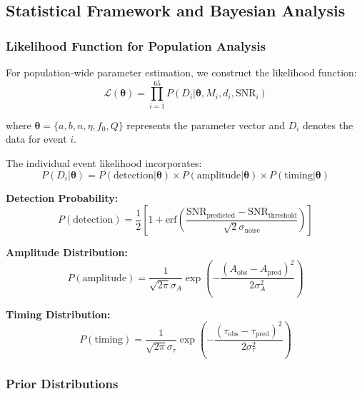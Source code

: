 \documentclass[reprint,amsmath,amssymb,aps,prd]{revtex4-2}
\begin{document}
\subsection{Statistical Framework and Bayesian Analysis}

\subsubsection{Likelihood Function for Population Analysis}

For population-wide parameter estimation, we construct the likelihood function:
\begin{equation}
\mathcal{L}(\boldsymbol{\theta}) = \prod_{i=1}^{65} P(D_i | \boldsymbol{\theta}, M_i, d_i, \text{SNR}_i)
\label{eq:population_likelihood}
\end{equation}

where $\boldsymbol{\theta} = \{a, b, n, \eta, f_0, Q\}$ represents the parameter vector and $D_i$ denotes the data for event $i$.

The individual event likelihood incorporates:
\begin{equation}
P(D_i | \boldsymbol{\theta}) = P(\text{detection} | \boldsymbol{\theta}) \times P(\text{amplitude} | \boldsymbol{\theta}) \times P(\text{timing} | \boldsymbol{\theta})
\label{eq:event_likelihood}
\end{equation}

\textbf{Detection Probability:}
\begin{equation}
P(\text{detection}) = \frac{1}{2}\left[1 + \text{erf}\left(\frac{\text{SNR}_{\text{predicted}} - \text{SNR}_{\text{threshold}}}{\sqrt{2}\sigma_{\text{noise}}}\right)\right]
\label{eq:detection_probability}
\end{equation}

\textbf{Amplitude Distribution:}
\begin{equation}
P(\text{amplitude}) = \frac{1}{\sqrt{2\pi}\sigma_A} \exp\left(-\frac{(A_{\text{obs}} - A_{\text{pred}})^2}{2\sigma_A^2}\right)
\label{eq:amplitude_likelihood}
\end{equation}

\textbf{Timing Distribution:}
\begin{equation}
P(\text{timing}) = \frac{1}{\sqrt{2\pi}\sigma_\tau} \exp\left(-\frac{(\tau_{\text{obs}} - \tau_{\text{pred}})^2}{2\sigma_\tau^2}\right)
\label{eq:timing_likelihood}
\end{equation}

\subsubsection{Prior Distributions}
\end{document}
